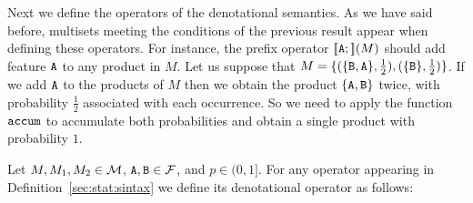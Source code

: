 Next we define the operators of the denotational semantics. As we have said before, multisets
meeting the conditions of the previous result appear when
defining these operators. For instance, the prefix operator
$[\![{\mathtt{A}};]\!](M)$ should add feature ${\mathtt{A}}$ to any product in $M$. Let us
suppose that
$M=\{
   (\{{\mathtt{B}},{\mathtt{A}}\},\frac{1}{2}),
   (\{{\mathtt{B}}\},\frac{1}{2})\}$.
If we add ${\mathtt{A}}$ to the products of $M$ then we obtain the product
$\{{\mathtt{A}},{\mathtt{B}}\}$ twice, with probability $\frac{1}{2}$ associated with each occurrence. So we
need to apply the function $\mathtt{accum}$ to accumulate both probabilities
and obtain a single product with probability $1$. 


\bdfn\label{def:semantic:operators}
  Let $M,M_1,M_2\in{\cal M}$, ${\mathtt{A}},{\mathtt{B}}\in{\cal F}$, and $p\in(0,1]$. For any operator appearing in
  Definition~\ref{sec:stat:sintax} we define its denotational operator
  as follows:
